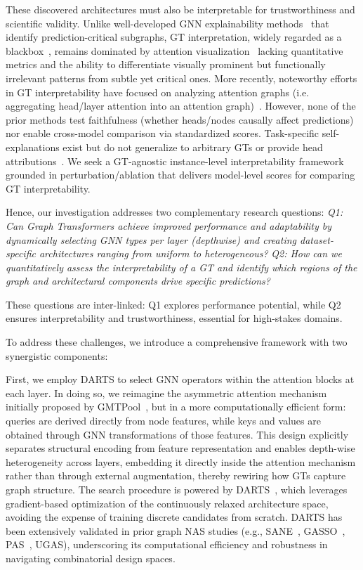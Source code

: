 \documentclass[lettersize,journal]{IEEEtran}
\begin{document}
These discovered architectures must also be interpretable for trustworthiness and scientific validity. Unlike well-developed GNN explainability methods~\cite{ying_gnnexplainer_2019} that identify prediction-critical subgraphs, GT interpretation, widely regarded as a blackbox~\cite{shehzad_graph_2024}, remains dominated by attention visualization~\cite{hussain_global_2022} lacking quantitative metrics and the ability to differentiate visually prominent but functionally irrelevant patterns from subtle yet critical ones. More recently, noteworthy efforts in GT interpretability have focused on analyzing attention graphs (i.e. aggregating head/layer attention into an attention graph)~\cite{el_towards_2025}.
However, none of the prior methods test faithfulness (whether heads/nodes causally affect predictions) nor enable cross-model comparison via standardized scores. Task-specific self-explanations exist but do not generalize to arbitrary GTs or provide head attributions~\cite{li_self-explainable_2024}. We seek a GT-agnostic instance-level interpretability framework grounded in perturbation/ablation that delivers model-level scores for comparing GT interpretability.

Hence, our investigation addresses two complementary research questions:
\textit{Q1: Can Graph Transformers achieve improved performance and adaptability by dynamically selecting GNN types per layer (depthwise) and creating dataset-specific architectures ranging from uniform to heterogeneous?}
\textit{Q2: How can we quantitatively assess the interpretability of a GT and identify which regions of the graph and architectural components drive specific predictions?}

These questions are  inter-linked: Q1 explores performance potential, while Q2 ensures interpretability and trustworthiness, essential for high-stakes domains.

To address these challenges, we introduce a comprehensive framework with two synergistic components:




First, we employ DARTS to select GNN operators within the attention blocks at each layer. In doing so, we reimagine the asymmetric attention mechanism initially proposed by GMTPool~\cite{baek_accurate_2021}, but in a more computationally efficient form: queries are derived directly from node features, while keys and values are obtained through GNN transformations of those features. This design explicitly separates structural encoding from feature representation and enables depth-wise heterogeneity across layers, embedding it directly inside the attention mechanism rather than through external augmentation, thereby rewiring how GTs capture graph structure. The search procedure is powered by DARTS~\cite{liu_darts_2019}, which leverages gradient-based optimization of the continuously relaxed architecture space, avoiding the expense of training discrete candidates from scratch. DARTS has been extensively validated in prior graph NAS studies (e.g., SANE~\cite{zhao_search_2021}, GASSO~\cite{qin_graph_2021}, PAS~\cite{wei_neural_2024}, UGAS), underscoring its computational efficiency and robustness in navigating combinatorial design spaces.
\end{document}
